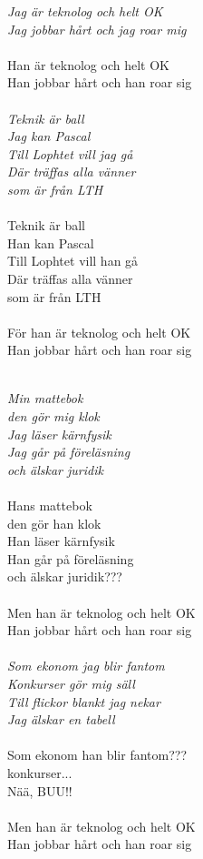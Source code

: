 \noindent\textit{Jag är teknolog och helt OK\\
Jag jobbar hårt och jag roar mig}\\\\
\noindent Han är teknolog och helt OK\\
Han jobbar hårt och han roar sig\\\\
\noindent\textit{Teknik är ball\\
Jag kan Pascal\\
Till Lophtet vill jag gå\\
Där träffas alla vänner\\
som är från LTH}\\\\
\noindent Teknik är ball\\
Han kan Pascal\\
Till Lophtet vill han gå\\
Där träffas alla vänner\\
som är från LTH\\\\
\noindent För han är teknolog och helt OK\\
Han jobbar hårt och han roar sig\\\\


\newpage

\noindent\textit{Min mattebok \\
den gör mig klok\\
Jag läser kärnfysik\\
Jag går på föreläsning\\
och älskar juridik}\\\\
\noindent Hans mattebok\\
den gör han klok\\
Han läser kärnfysik\\
Han går på föreläsning\\
och älskar juridik???\\\\
\noindent Men han är teknolog och helt OK\\
Han jobbar hårt och han roar sig\\\\
\noindent\textit{Som ekonom jag blir fantom\\
Konkurser gör mig säll\\
Till flickor blankt jag nekar\\
Jag älskar en tabell}\\\\
\noindent Som ekonom han blir fantom???\\
konkurser...\\
Nää, BUU!!\\\\
\noindent Men han är teknolog och helt OK\\
Han jobbar hårt och han roar sig\\



